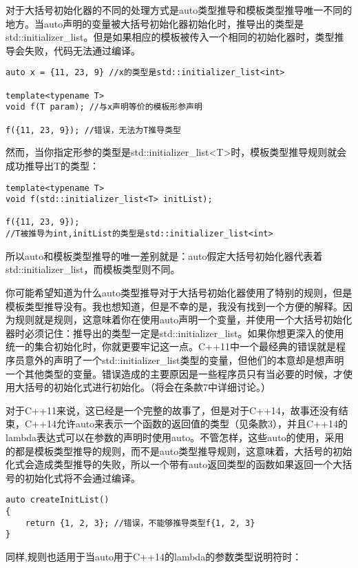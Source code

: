 对于大括号初始化器的不同的处理方式是auto类型推导和模板类型推导唯一不同的地方。当auto声明的变量被大括号初始化器初始化时，推导出的类型是std::initializer\_list。但是如果相应的模板被传入一个相同的初始化器时，类型推导会失败，代码无法通过编译。

\begin{lstlisting}
auto x = {11, 23, 9} //x的类型是std::initializer_list<int>

template<typename T>
void f(T param); //与x声明等价的模板形参声明

f({11, 23, 9}); //错误，无法为T推导类型
\end{lstlisting}

然而，当你指定形参的类型是std::initializer\_list<T>时，模板类型推导规则就会成功推导出T的类型：

\begin{lstlisting}
template<typename T>
void f(std::initializer_list<T> initList);

f({11, 23, 9}); 
//T被推导为int,initList的类型是std::initializer_list<int>
\end{lstlisting}

所以auto和模板类型推导的唯一差别就是：auto假定大括号初始化器代表着std::initializer\_list，而模板类型则不同。

你可能希望知道为什么auto类型推导对于大括号初始化器使用了特别的规则，但是模板类型推导没有。我也想知道，但是不幸的是，我没有找到一个方便的解释。因为规则就是规则，这意味着你在使用auto声明一个变量，并使用一个大括号初始化器时必须记住：推导出的类型一定是std::initializer\_list。如果你想更深入的使用统一的集合初始化时，你就更要牢记这一点。C++11中一个最经典的错误就是程序员意外的声明了一个std::initializer\_list类型的变量，但他们的本意却是想声明一个其他类型的变量。错误造成的主要原因是一些程序员只有当必要的时候，才使用大括号的初始化式进行初始化。（将会在条款7中详细讨论。）

对于C++11来说，这已经是一个完整的故事了，但是对于C++14，故事还没有结束，C++14允许auto来表示一个函数的返回值的类型（见条款3），并且C++14的lambda表达式可以在参数的声明时使用auto。不管怎样，这些auto的使用，采用的都是模板类型推导的规则，而不是auto类型推导规则，这意味着，大括号的初始化式会造成类型推导的失败，所以一个带有auto返回类型的函数如果返回一个大括号的初始化式将不会通过编译。

\begin{lstlisting}
auto createInitList() 
{
	return {1, 2, 3}; //错误，不能够推导类型f{1, 2, 3}
}
\end{lstlisting}

同样,规则也适用于当auto用于C++14的lambda的参数类型说明符时：


